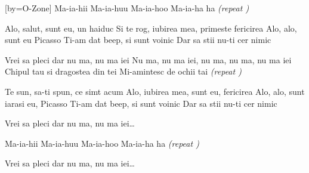 [by={O-Zone}]
\beginverse
Ma-ia-hii
Ma-ia-huu
Ma-ia-hoo
Ma-ia-ha ha
\textit{(repeat )}
\endverse

\beginverse
Alo, salut, sunt eu, un haiduc
Si te rog, iubirea mea, primeste fericirea
Alo, alo, sunt eu Picasso
Ti-am dat beep, si sunt voinic
Dar sa stii nu-ti cer nimic
\endverse 

\beginchorus
Vrei sa pleci dar nu ma, nu ma iei
Nu ma, nu ma iei, nu ma, nu ma, nu ma iei
Chipul tau si dragostea din tei
Mi-amintesc de ochii tai
\textit{(repeat )}
\endchorus

\beginverse 
Te sun, sa-ti spun, ce simt acum
Alo, iubirea mea, sunt eu, fericirea
Alo, alo, sunt iarasi eu, Picasso
Ti-am dat beep, si sunt voinic
Dar sa stii nu-ti cer nimic
\endverse

\beginchorus
Vrei sa pleci dar nu ma, nu ma iei\dots
\endchorus

\beginverse
Ma-ia-hii
Ma-ia-huu
Ma-ia-hoo
Ma-ia-ha ha
\textit{(repeat )}
\endverse

\beginchorus
Vrei sa pleci dar nu ma, nu ma iei\dots
\endchorus
\endsong
